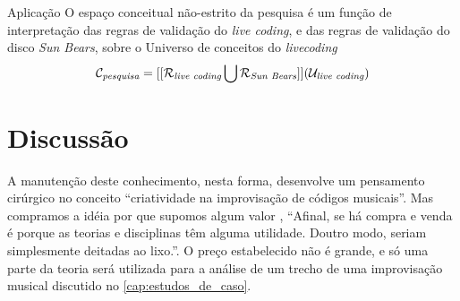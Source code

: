 \begin{example}{Aplicação}\label{eq:espaco_lc}
O espaço conceitual não-estrito da pesquisa é um função de interpretação das regras de validação do \emph{live coding}, e das regras de validação do disco \emph{Sun Bears}, sobre o Universo de conceitos do \emph{livecoding}
\begin{equation}
\mathcal{C}_\emph{pesquisa} = [[\mathcal{R}_\emph{live coding} \bigcup \mathcal{R}_\emph{Sun Bears}]](\mathcal{U}_\emph{live coding} )
\end{equation}
\end{example}

\section{Discussão}

 A manutenção deste conhecimento, nesta forma, desenvolve um pensamento cirúrgico no conceito ``criatividade na improvisação de códigos musicais''. Mas compramos a idéia por que supomos algum valor \cite[p.~20]{santos_filosofia_2008}, ``Afinal, se há compra e venda é porque as teorias e disciplinas têm alguma utilidade. Doutro modo, seriam simplesmente deitadas ao lixo.''. O preço estabelecido não é grande, e só uma parte da teoria será utilizada para a análise de um trecho de uma improvisação musical discutido no \autoref{cap:estudos_de_caso}.
